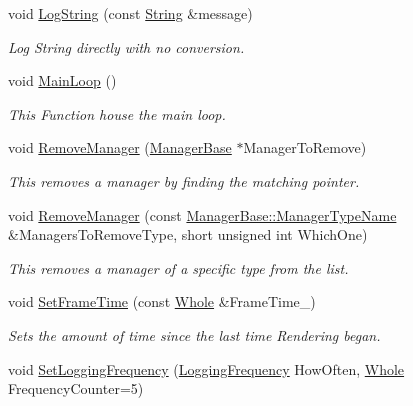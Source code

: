 \begin{DoxyCompactItemize}
void \hyperlink{classMezzanine_1_1World_a326001a06856d359fa7164db25d7c68c}{LogString} (const \hyperlink{namespaceMezzanine_acf9fcc130e6ebf08e3d8491aebcf1c86}{String} \&message)
\begin{DoxyCompactList}\small\item\em Log String directly with no conversion. \item\end{DoxyCompactList}\item 
void \hyperlink{classMezzanine_1_1World_a7c19ed5889b3de00a6f475b5922f9545}{MainLoop} ()
\begin{DoxyCompactList}\small\item\em This Function house the main loop. \item\end{DoxyCompactList}\item 
void \hyperlink{classMezzanine_1_1World_a01fadbd8c39094bac02d855da8d4a30f}{RemoveManager} (\hyperlink{classMezzanine_1_1ManagerBase}{ManagerBase} $\ast$ManagerToRemove)
\begin{DoxyCompactList}\small\item\em This removes a manager by finding the matching pointer. \item\end{DoxyCompactList}\item 
void \hyperlink{classMezzanine_1_1World_a64ac8469729593975fc5551f75a60283}{RemoveManager} (const \hyperlink{classMezzanine_1_1ManagerBase_a08cecf5169cad3e82be81a3a159b0b6e}{ManagerBase::ManagerTypeName} \&ManagersToRemoveType, short unsigned int WhichOne)
\begin{DoxyCompactList}\small\item\em This removes a manager of a specific type from the list. \item\end{DoxyCompactList}\item 
void \hyperlink{classMezzanine_1_1World_a6c00a6eda421a1d6969621bf366524f3}{SetFrameTime} (const \hyperlink{namespaceMezzanine_adcbb6ce6d1eb4379d109e51171e2e493}{Whole} \&FrameTime\_\-)
\begin{DoxyCompactList}\small\item\em Sets the amount of time since the last time Rendering began. \item\end{DoxyCompactList}\item 
void \hyperlink{classMezzanine_1_1World_a6622e9bf41f2bf7fc046745018c05554}{SetLoggingFrequency} (\hyperlink{classMezzanine_1_1World_a535c832832bbdebcdc623c3472a32e25}{LoggingFrequency} HowOften, \hyperlink{namespaceMezzanine_adcbb6ce6d1eb4379d109e51171e2e493}{Whole} FrequencyCounter=5)

\end{DoxyCompactItemize}

